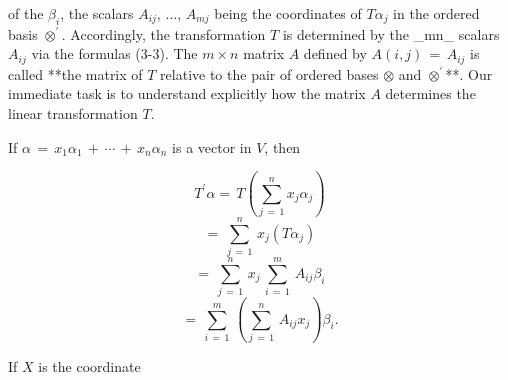 of the \(\beta_{i}\), the scalars \(A_{ij}\), \(\ldots\), \(A_{mj}\) being the coordinates of \(T\alpha_{j}\) in the ordered basis \(\otimes^{\prime}\). Accordingly, the transformation \(T\) is determined by the _mn_ scalars \(A_{ij}\) via the formulas (3-3). The \(m\times n\) matrix \(A\) defined by \(A(i,j)\,=\,A_{ij}\) is called **the matrix of \(T\) relative to the pair of ordered bases \(\otimes\) and \(\otimes^{\prime}\)**. Our immediate task is to understand explicitly how the matrix \(A\) determines the linear transformation \(T\).

If \(\alpha\,=\,x_{1}\alpha_{1}\,+\,\cdots\,+\,x_{n}\alpha_{n}\) is a vector in \(V\), then

\[T^{\prime}\alpha =\,T\left(\sum_{j\,=\,1}^{n}x_{j}\alpha_{j}\right)\] \[=\,\sum_{j\,=\,1}^{n}\,x_{j}(T\alpha_{j})\] \[=\,\sum_{j\,=\,1}^{n}\,x_{j}\,\sum_{i\,=\,1}^{m}\,A_{ij}\beta_{i}\] \[=\,\sum_{i\,=\,1}^{m}\,\left(\sum_{j\,=\,1}^{n}\,A_{ij}x_{j} \right)\beta_{i}.\]

If \(X\) is the coordinate 